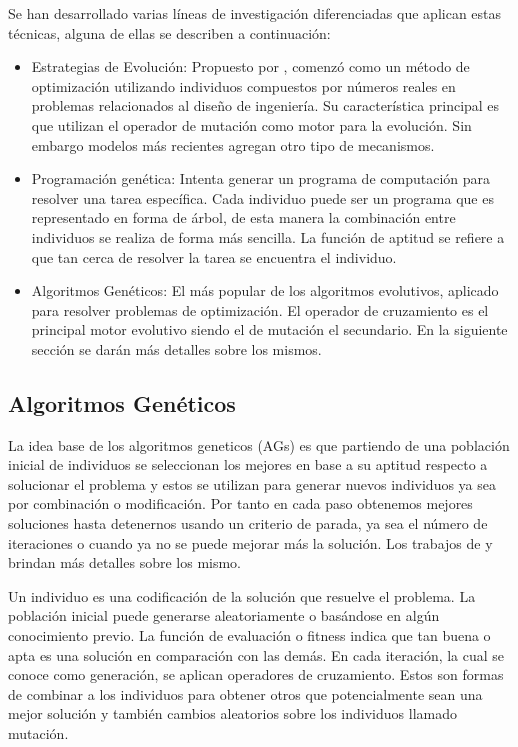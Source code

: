 Se han desarrollado varias líneas de investigación diferenciadas que aplican estas técnicas, alguna de ellas se describen a continuación:

\begin{itemize}

	\item Estrategias de Evolución: Propuesto por \citet{Ingo1971}, comenzó como un método de optimización utilizando individuos compuestos por números reales en problemas relacionados al diseño de ingeniería. Su característica principal es que utilizan el operador de mutación como motor para la evolución. Sin embargo modelos más recientes agregan otro tipo de mecanismos.
	\item Programación genética: Intenta generar un programa de computación para resolver una tarea específica. Cada individuo puede ser un programa que es representado en forma de árbol, de esta manera la combinación entre individuos se realiza de forma más sencilla. La función de aptitud se refiere a que tan cerca de resolver la tarea se encuentra el individuo.\citep{Koza1992}
	\item Algoritmos Genéticos: El más popular de los algoritmos evolutivos, aplicado para resolver problemas de optimización. El operador de cruzamiento es el principal motor evolutivo siendo el de mutación el secundario. En la siguiente sección se darán más detalles sobre los mismos.
\end{itemize}

\subsection{Algoritmos Genéticos}
La idea base de los algoritmos geneticos (AGs) es que partiendo de una población inicial de individuos se seleccionan los mejores en base a su aptitud respecto a solucionar el problema y estos se utilizan para generar nuevos individuos ya sea por combinación o modificación. Por tanto en cada paso obtenemos mejores soluciones hasta detenernos usando un criterio de parada, ya sea el número de iteraciones o cuando ya no se puede mejorar más la solución. Los trabajos de \citet{Goldberg1989} y \citet{Mitchell1996} brindan más detalles sobre los mismo.

Un individuo es una codificación de la solución que resuelve el problema. La población inicial puede generarse aleatoriamente o basándose en algún conocimiento previo. La función de evaluación o fitness indica que tan buena o apta es una solución en comparación con las demás.
En cada iteración, la cual se conoce como generación, se aplican operadores de cruzamiento. Estos son formas de combinar a los individuos para obtener otros que potencialmente sean una mejor solución y también cambios aleatorios sobre los individuos llamado mutación.


